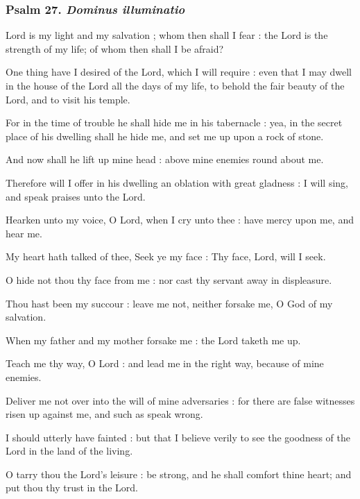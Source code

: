 \subsubsection{Psalm 27. \textit{Dominus illuminatio}}
 Lord is my light and my salvation ; whom then shall I fear : the Lord is the strength of my life; of whom then shall I be afraid?\par
{}
One thing have I desired of the Lord, which I will require : even that I may dwell in the house of the Lord all the days of my life, to behold the fair beauty of the Lord, and to visit his temple.\par
{}For in the time of trouble he shall hide me in his tabernacle : yea, in the secret place of his dwelling shall he hide me, and set me up upon a rock of stone.\par
{}And now shall he lift up mine head : above mine enemies round about me.\par
{}Therefore will I offer in his dwelling an oblation with great gladness : I will sing, and speak praises unto the Lord.\par
{}Hearken unto my voice, O Lord, when I cry unto thee : have mercy upon me, and hear me.\par
{}My heart hath talked of thee, Seek ye my face : Thy face, Lord, will I seek.\par
{}O hide not thou thy face from me : nor cast thy servant away in displeasure.\par
{}Thou hast been my succour : leave me not, neither forsake me, O God of my salvation.\par
{}When my father and my mother forsake me : the Lord taketh me up.\par
{}Teach me thy way, O Lord : and lead me in the right way, because of mine enemies.\par
{}Deliver me not over into the will of mine adversaries : for there are false witnesses risen up against me, and such as speak wrong.\par
{}I should utterly have fainted : but that I believe verily to see the goodness of the Lord in the land of the living.\par
{}O tarry thou the Lord's leisure : be strong, and he shall comfort thine heart; and put thou thy trust in the Lord.\par

